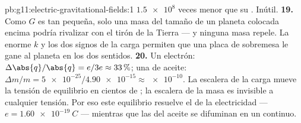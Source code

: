 \begin{solution}{pb:g11:electric-gravitational-fields:1}
$\num{1.5e8}$ veces menor que su . Inútil.
\textbf{19.} Como $G$ es tan pequeña, solo una masa del tamaño de un
planeta colocada encima podría rivalizar con el tirón de la Tierra ---
y ninguna masa repele. La enorme $k$ y los dos signos de la carga
permiten que una placa de sobremesa le gane al planeta en los dos
sentidos.
\textbf{20.} Un electrón: $\Delta\abs{q}/\abs{q} = e/3e \approx 33\,\%$;
una  de aceite:
$\Delta m/m = \num{5e-25} / \num{4.90e-15} \approx \num{e-10}$. La
escalera de la carga mueve la tensión de equilibrio en cientos de
; la escalera de la masa es invisible a cualquier tensión. Por
eso este equilibrio resuelve el  de la electricidad ---
$e = \qty{1.60e-19}{C}$ --- mientras que las  del aceite se
difuminan en un continuo.
\end{solution}
